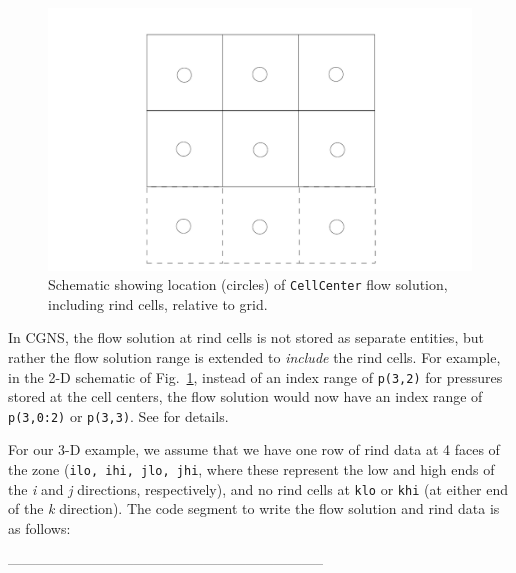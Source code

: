 \documentclass[12pt]{article}
\begin{document}
\begin{figure}[hpbt]
\centerline{{\includegraphics[width=120mm]{figures/cellcenter_rind}}}
\caption{Schematic showing location (circles) of {\tt CellCenter}
flow solution, including rind cells, relative to grid.}
\label{FIGcellcenter_rind}
\end{figure}
%

In CGNS, the flow solution at
rind cells is not stored as separate entities, but rather the 
flow solution range is extended to {\it include} the rind cells.  For
example, in the 2-D schematic of Fig.~\ref{FIGcellcenter_rind}, instead
of an index range of {\tt p(3,2)} for pressures stored at the cell
centers, the flow solution would now have an index range of 
{\tt p(3,0:2)} or {\tt p(3,3)}.  See \cite{ALLMARAS} for details.

For our 3-D example, we assume that we have one row of rind data
at 4 faces of the zone ({\tt ilo, ihi, jlo, jhi}, where these
represent the low and high ends of the {\it i} and {\it j}
directions, respectively), and
no rind cells at {\tt klo} or {\tt khi} (at either end of the {\it k}
direction).
The code segment to write the flow solution and rind data is as
follows:

--------------------------------------------------------------------
\end{document}
